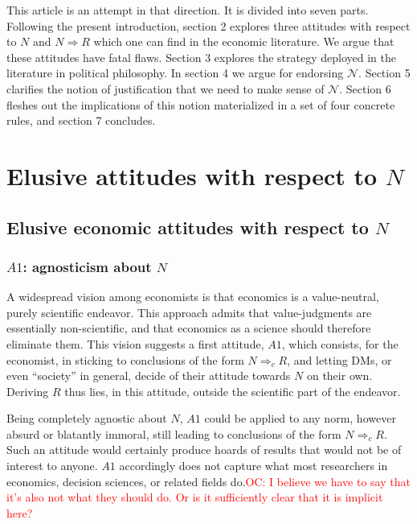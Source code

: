 \documentclass[preprint, french, english, 11pt, authoryear]{elsarticle}%
\newcommand{\protectforpdf}[1]{\texorpdfstring{\ensuremath{#1}}{#1}}
\newcommand{\commentOC}[1]{\textcolor{red}{OC: #1}}
\newcommand{\adv}{\mathscr{N}}
\begin{document}
This article is an attempt in that direction. It is divided into seven parts. Following the present introduction, section 2 explores three attitudes with respect to $N$ and $N ⇒ R$ which one can find in the economic literature. We argue that these attitudes have fatal flaws. Section 3 explores the strategy deployed in the literature in political philosophy. In section 4 we argue for endorsing $\adv$. Section 5 clarifies the notion of justification that we need to make sense of $\adv$. Section 6 fleshes out the implications of this notion materialized in a set of four concrete rules, and section 7 concludes.

\section{Elusive attitudes with respect to \protectforpdf{N}}
\subsection{Elusive economic attitudes with respect to \protectforpdf{N}}
\subsubsection{\protectforpdf{A1}: agnosticism about \protectforpdf{N}}
A widespread vision among economists is that economics is a value-neutral, purely scientific endeavor. This approach admits that value-judgments are essentially non-scientific, and that economics as a science should therefore eliminate them. This vision suggests a first attitude, $A1$, which consists, for the economist, in sticking to conclusions of the form $N ⇒_c R$, and letting \acp{DM}, or even “society” in general, decide of their attitude towards $N$ on their own. Deriving $R$ thus lies, in this attitude, outside the scientific part of the endeavor. 

Being completely agnostic about $N$, $A1$ could be applied to any norm, however absurd or blatantly immoral, still leading to conclusions of the form $N ⇒_c R$. Such an attitude would certainly produce hoards of results that would not be of interest to anyone. $A1$ accordingly does not capture what most researchers in economics, decision sciences, or related fields do.\commentOC{I believe we have to say that it’s also not what they should do. Or is it sufficiently clear that it is implicit here?}
\end{document}
